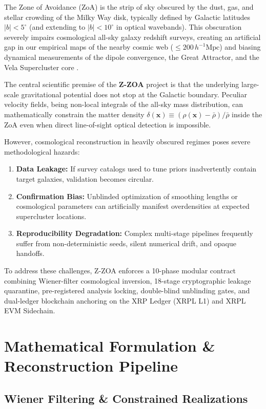 \documentclass[11pt,a4paper]{article}
\begin{document}
The Zone of Avoidance (ZoA) is the strip of sky obscured by the dust, gas, and stellar crowding of the Milky Way disk, typically defined by Galactic latitudes $|b| < 5^\circ$ (and extending to $|b| < 10^\circ$ in optical wavebands). This obscuration severely impairs cosmological all-sky galaxy redshift surveys, creating an artificial gap in our empirical maps of the nearby cosmic web ($\le 200\,h^{-1}\text{Mpc}$) and biasing dynamical measurements of the dipole convergence, the Great Attractor, and the Vela Supercluster core \cite{KraanKorteweg2000, KraanKorteweg2024}.

The central scientific premise of the \textbf{Z-ZOA} project is that the underlying large-scale gravitational potential does not stop at the Galactic boundary. Peculiar velocity fields, being non-local integrals of the all-sky mass distribution, can mathematically constrain the matter density $\delta(\mathbf{x}) \equiv (\rho(\mathbf{x}) - \bar{\rho})/\bar{\rho}$ inside the ZoA even when direct line-of-sight optical detection is impossible.

However, cosmological reconstruction in heavily obscured regimes poses severe methodological hazards:
\begin{enumerate}
    \item \textbf{Data Leakage:} If survey catalogs used to tune priors inadvertently contain target galaxies, validation becomes circular.
    \item \textbf{Confirmation Bias:} Unblinded optimization of smoothing lengths or cosmological parameters can artificially manifest overdensities at expected supercluster locations.
    \item \textbf{Reproducibility Degradation:} Complex multi-stage pipelines frequently suffer from non-deterministic seeds, silent numerical drift, and opaque handoffs.
\end{enumerate}

To address these challenges, Z-ZOA enforces a 10-phase modular contract combining Wiener-filter cosmological inversion, 18-stage cryptographic leakage quarantine, pre-registered analysis locking, double-blind unblinding gates, and dual-ledger blockchain anchoring on the XRP Ledger (XRPL L1) and XRPL EVM Sidechain.

\section{Mathematical Formulation \& Reconstruction Pipeline}

\subsection{Wiener Filtering \& Constrained Realizations}
\end{document}
